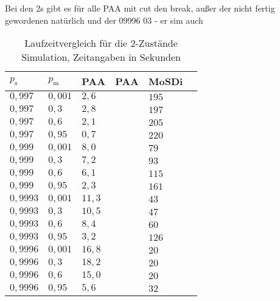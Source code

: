  Bei den 2s gibt es für alle PAA mit cut den break, außer der nicht fertig gewordenen natürlich und der 09996 03 - er sim auch
\begin{table}[h]
\centering
\caption[Laufzeitvergleich für die 2-Zustände Simulation]{Laufzeitvergleich für die 2-Zustände Simulation, Zeitangaben in Sekunden}
\label{2s_laufzeit_paa}
\begin{tabular}{|l|l||l|l|l|l|} \hline
$p_\text{s}$ & $p_\text{m}$  & PAA & PAA & MoSDi \\  \hline \hline
$0,997  $ & $ 0,001$ & $2,6  $ & $ $ & $ 195$ \\ \hline
$0,997  $ & $ 0,3  $ & $2,8  $ & $ $ & $ 197 $ \\ \hline
$0,997  $ & $ 0,6  $ & $2,1  $ & $ $ & $ 205 $ \\ \hline
$0,997  $ & $ 0,95 $ & $0,7  $ & $ $ & $ 220$ \\ \hline
$0,999  $ & $ 0,001$ & $8,0  $ & $ $ & $ 79$ \\ \hline
$0,999  $ & $ 0,3  $ & $7,2  $ & $ $ & $ 93$ \\ \hline
$0,999  $ & $ 0,6  $ & $6,1  $ & $ $ & $ 115$ \\ \hline
$0,999  $ & $ 0,95 $ & $2,3  $ & $ $ & $ 161$ \\ \hline
$0,9993 $ & $ 0,001$ & $11,3 $ & $ $ & $ 43$ \\ \hline
$0,9993 $ & $ 0,3  $ & $10,5 $ & $ $ & $ 47$ \\ \hline
$0,9993 $ & $ 0,6  $ & $8,4  $ & $ $ & $ 60$ \\ \hline
$0,9993 $ & $ 0,95 $ & $3,2  $ & $ $ & $ 126$ \\ \hline
\cellcolor{gray!25}$0,9996 $ &\cellcolor{gray!25} $ 0,001$ & $16,8 $ & $ $ & $ 20$ \\ \hline
$0,9996 $ & $ 0,3  $ & $18,2 $ & $ $ & $ 20$ \\ \hline
$0,9996 $ & $ 0,6  $ & $15,0 $ & $ $ & $ 20$ \\ \hline
$0,9996 $ & $ 0,95 $ & $5,6  $ & $ $ & $ 32$ \\ \hline
\end{tabular}
\end{table}


